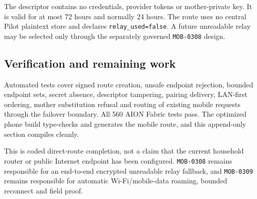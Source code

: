 The descriptor contains no credentials, provider tokens or mother-private key.  It is
valid for at most 72 hours and normally 24 hours.  The route uses no central Pilot
plaintext store and declares \texttt{relay\_used=false}.  A future unreadable relay may
be selected only through the separately governed \texttt{MOB-0308} design.

\subsection{Verification and remaining work}

Automated tests cover signed route creation, unsafe endpoint rejection, bounded endpoint
sets, secret absence, descriptor tampering, pairing delivery, LAN-first ordering, mother
substitution refusal and routing of existing mobile requests through the failover
boundary.  All 560 AION Fabric tests pass.  The optimized phone build type-checks and
generates the mobile route, and this append-only section compiles cleanly.

This is coded direct-route completion, not a claim that the current household router or
public Internet endpoint has been configured.  \texttt{MOB-0308} remains responsible for
an end-to-end encrypted unreadable relay fallback, and \texttt{MOB-0309} remains
responsible for automatic Wi-Fi/mobile-data roaming, bounded reconnect and field proof.
